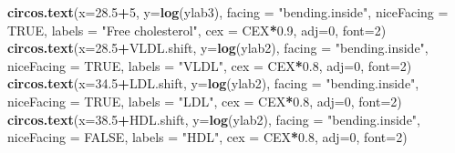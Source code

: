 \documentclass[
]{article}
\newenvironment{Shaded}{\begin{snugshade}}{\end{snugshade}}
\newcommand{\DataTypeTok}[1]{\textcolor[rgb]{0.13,0.29,0.53}{#1}}
\newcommand{\DecValTok}[1]{\textcolor[rgb]{0.00,0.00,0.81}{#1}}
\newcommand{\FloatTok}[1]{\textcolor[rgb]{0.00,0.00,0.81}{#1}}
\newcommand{\KeywordTok}[1]{\textcolor[rgb]{0.13,0.29,0.53}{\textbf{#1}}}
\newcommand{\NormalTok}[1]{#1}
\newcommand{\OperatorTok}[1]{\textcolor[rgb]{0.81,0.36,0.00}{\textbf{#1}}}
\newcommand{\OtherTok}[1]{\textcolor[rgb]{0.56,0.35,0.01}{#1}}
\newcommand{\StringTok}[1]{\textcolor[rgb]{0.31,0.60,0.02}{#1}}
\begin{document}
\begin{Shaded}
\begin{Highlighting}[]
\KeywordTok{circos.text}\NormalTok{(}\DataTypeTok{x=}\FloatTok{28.5}\OperatorTok{+}\DecValTok{5}\NormalTok{, }\DataTypeTok{y=}\KeywordTok{log}\NormalTok{(ylab3), }\DataTypeTok{facing =} \StringTok{"bending.inside"}\NormalTok{, }\DataTypeTok{niceFacing =} \OtherTok{TRUE}\NormalTok{, }\DataTypeTok{labels =} \StringTok{"Free cholesterol"}\NormalTok{, }\DataTypeTok{cex =}\NormalTok{ CEX}\OperatorTok{*}\FloatTok{0.9}\NormalTok{, }\DataTypeTok{adj=}\DecValTok{0}\NormalTok{, }\DataTypeTok{font=}\DecValTok{2}\NormalTok{)}
\KeywordTok{circos.text}\NormalTok{(}\DataTypeTok{x=}\FloatTok{28.5}\OperatorTok{+}\NormalTok{VLDL.shift, }\DataTypeTok{y=}\KeywordTok{log}\NormalTok{(ylab2), }\DataTypeTok{facing =} \StringTok{"bending.inside"}\NormalTok{, }\DataTypeTok{niceFacing =} \OtherTok{TRUE}\NormalTok{, }\DataTypeTok{labels =} \StringTok{"VLDL"}\NormalTok{, }\DataTypeTok{cex =}\NormalTok{ CEX}\OperatorTok{*}\FloatTok{0.8}\NormalTok{, }\DataTypeTok{adj=}\DecValTok{0}\NormalTok{, }\DataTypeTok{font=}\DecValTok{2}\NormalTok{)}
\KeywordTok{circos.text}\NormalTok{(}\DataTypeTok{x=}\FloatTok{34.5}\OperatorTok{+}\NormalTok{LDL.shift, }\DataTypeTok{y=}\KeywordTok{log}\NormalTok{(ylab2), }\DataTypeTok{facing =} \StringTok{"bending.inside"}\NormalTok{, }\DataTypeTok{niceFacing =} \OtherTok{TRUE}\NormalTok{, }\DataTypeTok{labels =} \StringTok{"LDL"}\NormalTok{, }\DataTypeTok{cex =}\NormalTok{ CEX}\OperatorTok{*}\FloatTok{0.8}\NormalTok{, }\DataTypeTok{adj=}\DecValTok{0}\NormalTok{, }\DataTypeTok{font=}\DecValTok{2}\NormalTok{)}
\KeywordTok{circos.text}\NormalTok{(}\DataTypeTok{x=}\FloatTok{38.5}\OperatorTok{+}\NormalTok{HDL.shift, }\DataTypeTok{y=}\KeywordTok{log}\NormalTok{(ylab2), }\DataTypeTok{facing =} \StringTok{"bending.inside"}\NormalTok{, }\DataTypeTok{niceFacing =} \OtherTok{FALSE}\NormalTok{, }\DataTypeTok{labels =} \StringTok{"HDL"}\NormalTok{, }\DataTypeTok{cex =}\NormalTok{ CEX}\OperatorTok{*}\FloatTok{0.8}\NormalTok{, }\DataTypeTok{adj=}\DecValTok{0}\NormalTok{, }\DataTypeTok{font=}\DecValTok{2}\NormalTok{) }


\end{Highlighting}
\end{Shaded}
\end{document}
